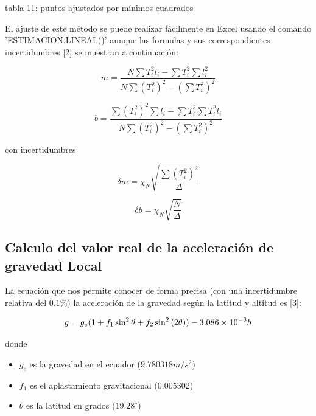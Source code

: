 \documentclass[DIV=calc, paper=a4, fontsize=11pt]{scrartcl}
\begin{document}
\begin{multicols}{2}
\caption{tabla 11: puntos ajustados por mínimos cuadrados}

El ajuste de este método se puede realizar fácilmente en Excel usando el comando 'ESTIMACION.LINEAL()' aunque las formulas y sus correspondientes incertidumbres [2] se muestran a continuación:

\begin{equation*}
    m = \frac{N\sum T_{i}^{2} l_i - \sum T_{i}^{2} \sum l_{i}^{2}}{N \sum (T_{i}^{2})^2 - (\sum T_{i}^{2})^2}
\end{equation*}

\begin{equation*}
    b = \frac{\sum (T_{i}^{2})^2 \sum l_{i} - \sum T_{i}^{2} \sum T_{i}^{2} l_{i}}{N \sum (T_{i}^{2})^2 - (\sum T_{i}^{2})^2}
\end{equation*}

con incertidumbres

\begin{equation*}
    \delta m =  \chi_N \sqrt{\frac{\sum (T_{i}^{2})^2}{\Delta}}
\end{equation*}

\begin{equation*}
    \delta b = \chi_N \sqrt{\frac{N}{\Delta}}
\end{equation*}


\subsection*{Calculo del valor real de la aceleración de gravedad Local}


La ecuación que nos permite conocer de forma precisa (con una incertidumbre relativa del $0.1\%$) la aceleración de la gravedad  según la latitud y altitud es [3]:

\begin{equation}
    g = g_e (1 +f_1 \sin^2{\theta} + f_2 \sin^2{(2\theta)}) - \num{3.086 e -6} h
\end{equation}

donde 

\begin{itemize}
    \item $g_e$ es la gravedad en el ecuador ($9.780318 m/s^2$)
    
        \item $f_1$ es el aplastamiento gravitacional ($0.005302$)
    
    \item $\theta$ es la latitud en grados ($19.28 ^{\circ}$)
    

\end{itemize}
\end{multicols}
\end{document}
